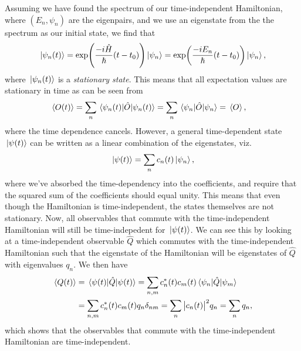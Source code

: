         Assuming we have found the spectrum of our time-independent Hamiltonian,
        where $(E_n, \psi_n)$ are the eigenpairs, and we use an eigenstate from
        the the spectrum as our initial state, we find that
        \begin{gather}
            \ket*{\psi_n(t)}
            = \exp(\frac{-i\hat{H}}{\hslash}(t - t_0))\ket*{\psi_n}
            = \exp(\frac{-i E_n}{\hslash} (t - t_0))\ket*{\psi_n},
        \end{gather}
        where $\ket*{\psi_n(t)}$ is a \emph{stationary state}.
        This means that all expectation values are stationary in time as can be
        seen from
        \begin{align}
            \expval*{O(t)}
            &= \sum_{n}\mel*{\psi_n(t)}{\hat{O}}{\psi_n(t)}
            = \sum_{n}\mel*{\psi_n}{\hat{O}}{\psi_n}
            = \expval*{O},
        \end{align}
        where the time dependence cancels.
        However, a general time-dependent state $\ket*{\psi(t)}$ can be written
        as a linear combination of the eigenstates, viz.
        \begin{align}
            \ket*{\psi(t)} = \sum_{n}c_n(t)\ket*{\psi_n},
        \end{align}
        where we've absorbed the time-dependency into the coefficients, and
        require that the squared sum of the coefficients should equal unity.
        This means that even though the Hamiltonian is time-independent, the
        states themselves are not stationary.
        Now, all observables that commute with the time-independent Hamiltonian
        will still be time-indepedent for $\ket*{\psi(t)}$.
        We can see this by looking at a time-independent observable $\hat{Q}$
        which commutes with the time-independent Hamiltonian such that the
        eigenstate of the Hamiltonian will be eigenstates of $\hat{Q}$ with
        eigenvalues $q_n$.
        We then have
        \begin{align}
            \expval*{Q(t)}
            &= \mel*{\psi(t)}{\hat{Q}}{\psi(t)}
            = \sum_{n, m} c^{*}_n(t) c_m(t)
            \mel*{\psi_n}{\hat{Q}}{\psi_m}
            \\
            &= \sum_{n, m}
            c^{*}_n(t) c_m(t) q_n \delta_{nm}
            = \sum_{n}
            \abs{c_n(t)}^2 q_n
            = \sum_{n}
            q_n,
        \end{align}
        which shows that the observables that commute with the time-independent
        Hamiltonian are time-independent.


